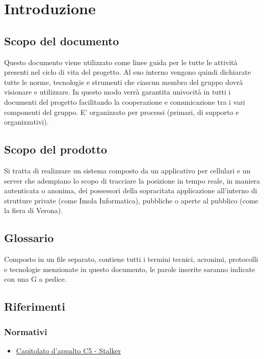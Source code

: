 \section{Introduzione}
\subsection{Scopo del documento}
Questo documento viene utilizzato come linee guida per le tutte le attività presenti nel ciclo di vita del progetto.
Al suo interno vengono quindi dichiarate tutte le norme, tecnologie e strumenti che ciascun membro del gruppo \Gruppo dovrà visionare e utilizzare.
In questo modo verrà garantita univocità in tutti i documenti del progetto facilitando la cooperazione e comunicazione tra i vari componenti del gruppo.
E' organizzato per processi (primari, di supporto e organizzativi).
	
\subsection{Scopo del prodotto}
Si tratta di realizzare un sistema composto da un applicativo per cellulari e un server che adempiano lo scopo di tracciare la posizione in tempo reale, in maniera autenticata o anonima, dei possessori della sopracitata applicazione all’interno di strutture private (come Imola Informatica),  pubbliche o aperte al pubblico (come la fiera di Verona).
	 
\subsection{Glossario}
Composto in un file separato, contiene tutti i termini tecnici, acronimi, protocolli e tecnologie menzionate in questo documento, le parole inserite saranno indicate con una G a pedice.
	
\subsection{Riferimenti} 
\subsubsection{Normativi}
\begin{itemize}
	\item \href{https://www.math.unipd.it/~tullio/IS-1/2019/Progetto/C5.pdf}{Capitolato d'appalto C5 - Stalker}
\end{itemize}

